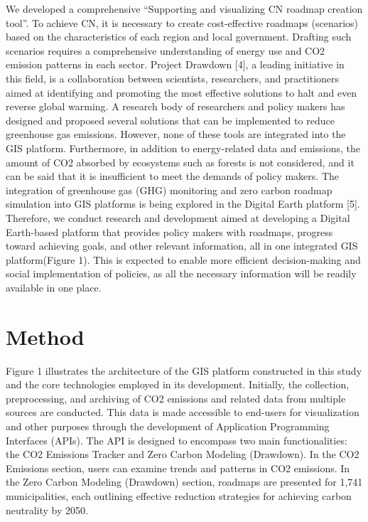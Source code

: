 We developed a comprehensive “Supporting and visualizing CN roadmap creation tool”. To achieve CN, it is necessary to create cost-effective roadmaps (scenarios) based on the characteristics of each region and local government. Drafting such scenarios requires a comprehensive understanding of energy use and CO2 emission patterns in each sector. Project Drawdown [4], a leading initiative in this field, is a collaboration between scientists, researchers, and practitioners aimed at identifying and promoting the most effective solutions to halt and even reverse global warming. A research body of researchers and policy makers has designed and proposed several solutions that can be implemented to reduce greenhouse gas emissions. However, none of these tools are integrated into the GIS 
platform. Furthermore, in addition to energy-related data and emissions, the amount of CO2 absorbed by ecosystems 
such as forests is not considered, and it can be said that it is insufficient to meet the demands of policy makers. The 
integration of greenhouse gas (GHG) monitoring and zero carbon roadmap simulation into GIS platforms is being 
explored in the Digital Earth platform [5]. Therefore, we conduct research and development aimed at developing a 
Digital Earth-based platform that provides policy makers with roadmaps, progress toward achieving goals, and other 
relevant information, all in one integrated GIS platform(Figure 1). This is expected to enable more efficient 
decision-making and social implementation of policies, as all the necessary information will be readily available in 
one place.\par

\section{Method}
Figure 1 illustrates the architecture of the GIS platform constructed in this study and the core technologies employed in its development. Initially, the collection, preprocessing, and archiving of CO2 emissions and related data from multiple sources are conducted. This data is made accessible to end-users for visualization and other purposes through the development of Application Programming Interfaces (APIs). The API is designed to encompass two main functionalities: the CO2 Emissions Tracker and Zero Carbon Modeling (Drawdown). In the CO2 Emissions section, users can examine trends and patterns in CO2 emissions. In the Zero Carbon Modeling (Drawdown) section, roadmaps are presented for 1,741 municipalities, each outlining effective reduction strategies for achieving carbon neutrality by 2050.\par

